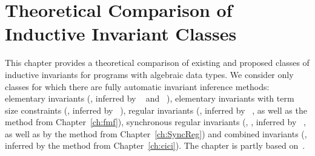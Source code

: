 \chapter{Theoretical Comparison of Inductive Invariant Classes}\label{ch:comparison}

This chapter provides a theoretical comparison of existing and proposed classes of inductive invariants for programs with algebraic data types.
We consider only classes for which there are fully automatic invariant inference methods: elementary invariants (\elemclass{}, inferred by \spacer{}~\cite{komuravelli2016smt} and \hoice{}~\cite{10.1007/978-3-030-02768-1_8}), elementary invariants with term size constraints (\sizeelemclass{}, inferred by \eldarica{}~\cite{8603013}), regular invariants (\regclass{}, inferred by \rchc{}~\cite{haude2020}, as well as the method from Chapter~\cref{ch:fmf}), synchronous regular invariants (\syncRegFlatClass{}, \syncRegFullClass{}, inferred by \rchc{}~\cite{haude2020}, as well as by the method from Chapter~\cref{ch:SyncReg}) and combined invariants (\regelemclass{}, inferred by the method from Chapter~\cref{ch:cici}).
The chapter is partly based on~\cite{10.1145/3453483.3454055}.

